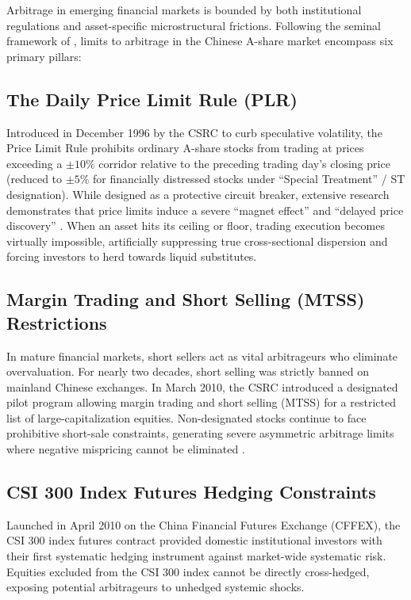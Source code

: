 \documentclass[12pt, a4paper]{article}
\begin{document}
Arbitrage in emerging financial markets is bounded by both institutional regulations and asset-specific microstructural frictions. Following the seminal framework of \citet{Gu2018}, limits to arbitrage in the Chinese A-share market encompass six primary pillars:

\subsection{The Daily Price Limit Rule (PLR)}

Introduced in December 1996 by the CSRC to curb speculative volatility, the Price Limit Rule prohibits ordinary A-share stocks from trading at prices exceeding a $\pm10\%$ corridor relative to the preceding trading day's closing price (reduced to $\pm5\%$ for financially distressed stocks under ``Special Treatment'' / ST designation). While designed as a protective circuit breaker, extensive research demonstrates that price limits induce a severe ``magnet effect'' and ``delayed price discovery'' \citep{Kim2000}. When an asset hits its ceiling or floor, trading execution becomes virtually impossible, artificially suppressing true cross-sectional dispersion and forcing investors to herd towards liquid substitutes.

\subsection{Margin Trading and Short Selling (MTSS) Restrictions}

In mature financial markets, short sellers act as vital arbitrageurs who eliminate overvaluation. For nearly two decades, short selling was strictly banned on mainland Chinese exchanges. In March 2010, the CSRC introduced a designated pilot program allowing margin trading and short selling (MTSS) for a restricted list of large-capitalization equities. Non-designated stocks continue to face prohibitive short-sale constraints, generating severe asymmetric arbitrage limits where negative mispricing cannot be eliminated \citep{Beber2013}.

\subsection{CSI 300 Index Futures Hedging Constraints}

Launched in April 2010 on the China Financial Futures Exchange (CFFEX), the CSI 300 index futures contract provided domestic institutional investors with their first systematic hedging instrument against market-wide systematic risk. Equities excluded from the CSI 300 index cannot be directly cross-hedged, exposing potential arbitrageurs to unhedged systemic shocks.
\end{document}
